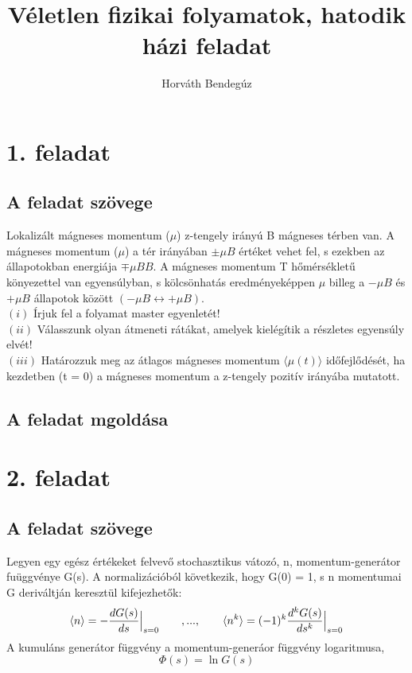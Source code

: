 \documentclass[12pt]{article}
\title{Véletlen fizikai folyamatok, hatodik házi feladat}
\author{Horváth Bendegúz}
\begin{document}
\maketitle
\section*{1. feladat}
\subsection*{A feladat szövege}
Lokalizált mágneses momentum ($\mu$) z-tengely irányú B mágneses térben van. A mágneses
momentum ($\mu$) a tér irányában $\pm\mu B$ értéket vehet fel, s ezekben az állapotokban energiája $ \mp\mu BB$. A mágneses momentum T hőmérsékletű könyezettel van egyensúlyban, s kölcsönhatás eredményeképpen $\mu$ billeg a $-\mu B$ és $+\mu B$ állapotok között $ (-\mu B \leftrightarrow  +\mu B)$.\\
$(i)$ Írjuk fel a folyamat master egyenletét!\\
$(ii)$ Válasszunk olyan átmeneti rátákat, amelyek kielégítik a részletes egyensúly elvét!\\
$(iii)$ Határozzuk meg az átlagos mágneses momentum $\langle \mu (t)\rangle$ időfejlődését, ha kezdetben (t = 0) a mágneses momentum a z-tengely pozitív irányába mutatott.
\subsection*{A feladat mgoldása}




\newpage
\section*{2. feladat}
\subsection*{A feladat szövege}
Legyen egy egész értékeket felvevő stochasztikus vátozó, n, momentum-generátor fuüggvénye G(s). A normalizációból következik, hogy G(0) = 1, s n momentumai G deriváltján keresztül kifejezhetők:
$$\langle n\rangle = - \frac{dG(s)}{ds} \Big |_{\substack{ s=0 }}\hspace{0.7cm}, ...,\hspace{0.7cm} \langle n^k \rangle = (-1)^k\frac{d^kG(s)}{ds^k} \Big |_{\substack{ s=0 }}$$
A kumuláns generátor függvény a momentum-generáor függvény logaritmusa,
$$ \Phi (s) = \ln{G(s)}$$
\end{document}
